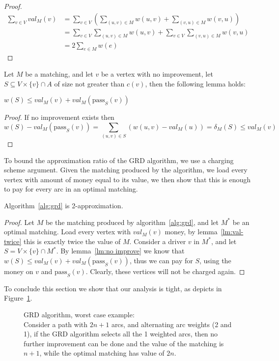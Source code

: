\begin{proof}
\begin{equation}
\begin{split}
\sum_{v \in V} val_M(v)	& = 
\sum_{v \in V} \left( \sum_{(u, v) \in M} w(u, v) + \sum_{(v, u) \in M} w(v, u) \right)	\\
						& = \sum_{v \in V}\sum_{(u, v) \in M} w(u, v) + 
							\sum_{v \in V}\sum_{(v, u) \in M} w(v, u)					\\
						& = 2 \sum_{e \in M} w(e)
\end{split}
\end{equation}
\end{proof}

Let $M$ be a matching, and let $v$ be a vertex with no improvement,
let $S \subseteq V \times \{v\} \cap A$ of size not greater than $c(v)$,
then the following lemma holds:

\begin{lemma}
\label{lm:no improve}
$w(S) \leq val_M(v) + val_M(\text{pass}_S(v))$
\end{lemma}

\begin{proof}
If no improvement exists then
$$
w(S) - val_M(\text{pass}_S(v))=
\sum_{(u,v) \in S}(w(u,v) - val_M(u)) =
\delta_M(S) 
\leq val_M(v)
$$
\end{proof}

To bound the approximation ratio of the GRD algorithm, 
we use a charging scheme argument.
Given the matching produced by the algorithm, 
we load every vertex with amount of money equal to its value,
we then show that this is enough to pay for every arc in an optimal matching.   

\begin{theorem}
Algorithm~\ref{alg:grd} is 2-approximation.
\end{theorem}

\begin{proof}
Let $M$ be the matching produced by algorithm~\ref{alg:grd}, 
and let $M^*$ be an optimal matching.
Load every vertex with $val_M(v)$ money, 
by lemma~\ref{lm:val-twice} this is exactly twice the value of $M$.
Consider a driver $v$ in $M^*$, and let $S = V \times \{v\} \cap M^*$.
By lemma~\ref{lm:no improve} we know that $w(S) \leq val_M(v) + val_M(\text{pass}_S(v))$,
thus we can pay for $S$, using the money on $v$ and $\text{pass}_S(v)$.
Clearly, these vertices will not be charged again.
\end{proof}

To conclude this section we show that our analysis is tight, 
as depicts in Figure~\ref{fig:grd worst}.
\begin{figure}
\centering

\caption[]{
\label{fig:grd worst}
GRD algorithm, worst case example: \\
Consider a path with $2n + 1$ arcs,
and alternating arc weights (2 and 1),
if the GRD algorithm selects all the 1 weighted arcs,
then no further improvement can be done and the value of the matching is $n + 1$,
while the optimal matching has value of $2n$.
}
\end{figure}